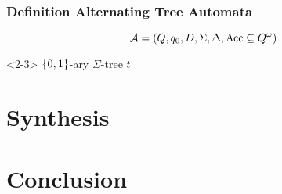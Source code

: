 \documentclass{beamer}
\begin{document}
  \begin{frame}
    \frametitle{Definition Alternating Tree Automata}
    \begin{equation*}
      \mathcal{A} = \left(Q, q_{0}, D, \Sigma, \Delta,
        \operatorname{Acc}\subseteq Q^{\omega}\right)
    \end{equation*}
    \begin{overlayarea}{\textwidth}{0.8\textheight}
      \begin{onlyenv}<2-3>
        $\left\{0,1\right\}$-ary $\Sigma$-tree $t$\hfill{}
        \begin{center}
        \end{center}
      \end{onlyenv}
    \end{overlayarea}
  \end{frame}

  \section{Synthesis}
  \begin{frame}
  \end{frame}

  \begin{frame}
  \end{frame}

  \section{Conclusion}
  \begin{frame}
  \end{frame}

  \begin{frame}
  \end{frame}
\end{document}
